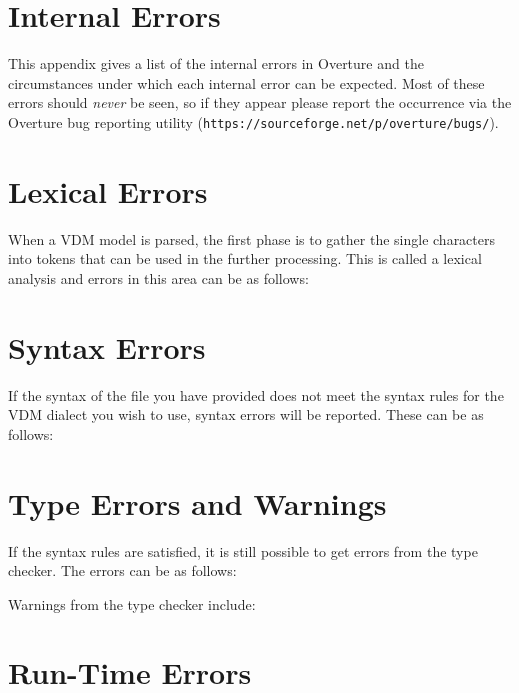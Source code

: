 \documentclass{overturerepchap}
\newcommand{\url}[1]{\texttt{#1}}
\begin{document}
\newpage
\chapter{Internal Errors}\label{app:internalerrors}

This appendix gives a list of the internal errors in Overture
and the circumstances under which each internal error can be expected.
Most of these errors should \emph{never} be seen, so if they appear
please report the occurrence via the Overture bug reporting utility
(\url{https://sourceforge.net/p/overture/bugs/}).



\newpage
\chapter{Lexical Errors}\label{app:lexerr}

When a VDM model is parsed, the first phase is to gather the single
characters into tokens that can be used in the further
processing. This is called a lexical analysis and errors in this area
can be as follows:



\newpage
\chapter{Syntax Errors}\label{app:synerr}

If the syntax of the file you have provided does not meet the
syntax rules for the VDM dialect you wish to use, syntax errors will be
reported. These can be as follows:



\newpage
\chapter{Type Errors and Warnings}\label{app:typeerr}

If the syntax rules are satisfied, it is still possible to get
errors from the type checker. The errors can be as
follows:



Warnings from the type checker include:



\newpage
\chapter{Run-Time Errors}\label{app:runtimeerr}
\end{document}
